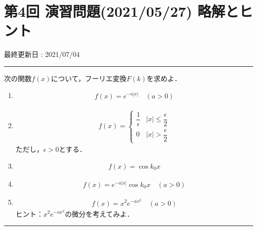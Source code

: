 \documentclass[11pt,a4]{jsarticle}
\numberwithin{equation}{section}
\begin{document}
\section*{第4回 演習問題(2021/05/27) 略解とヒント}
\begin{flushright}
 最終更新日 : 2021/07/04 
\end{flushright}
\hrule
\vspace*{.2cm}
\enshu
%
次の関数$f(x)$について，フーリエ変換$F(k)$を求めよ．
\begin{enumerate}[(1)]
  \item 
	\begin{align*}
	  f(x) = e^{-a\left|x\right|}\quad (a>0)
	\end{align*}	
  \item 
	\begin{align*}
	  f(x) = 
	  \begin{cases}
	    \dfrac{1}{\epsilon} & \left|x\right| \leq \dfrac{\epsilon}{2} \\[.2cm]
            0                   & \left|x\right| >  \dfrac{\epsilon}{2}
	  \end{cases}
	\end{align*}
	ただし，$\epsilon > 0$とする．
  \item 
	\begin{align*}
	  f(x) = \cos k_0 x
	\end{align*}
  \item	
	\begin{align*}
	  f(x) = e^{-a\left|x\right|}\cos k_0 x \quad (a>0) 
	\end{align*}
  \item	
	\begin{align*}
	  f(x) = x^2 e^{-ax^2} \quad (a>0)
	\end{align*}
	ヒント：$x^2 e^{-ax^2}$の微分を考えてみよ．
\end{enumerate}
%
\hrule
\vspace*{.2cm}
%
\end{document}
